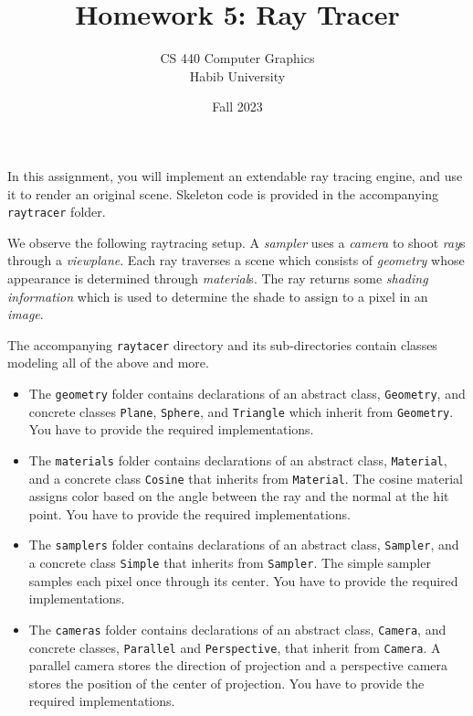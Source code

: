 \documentclass[addpoints]{exam}
\title{Homework 5: Ray Tracer}
\author{CS 440 Computer Graphics\\Habib University}
\date{Fall 2023}
\begin{document}
\maketitle
\thispagestyle{empty}

In this assignment, you will implement an extendable ray tracing engine, and use it to render an original scene. Skeleton code is provided in the accompanying \texttt{raytracer} folder.

\begin{questions}

  We observe the  following raytracing setup. A \textit{sampler} uses a \textit{camera} to shoot \textit{ray}s through a \textit{viewplane}. Each ray traverses a scene which consists of \textit{geometry} whose appearance is determined through \emph{material}s. The ray returns some \textit{shading information} which is used to determine the shade to assign to a pixel in an \textit{image}.

The accompanying \texttt{raytacer} directory and its sub-directories contain classes modeling all of the above and more.
\begin{itemize}
\item The \texttt{geometry} folder contains declarations of an abstract class, \texttt{Geometry}, and concrete classes  \texttt{Plane}, \texttt{Sphere}, and \texttt{Triangle} which inherit from \texttt{Geometry}. You have to provide the required implementations.
\item The \texttt{materials} folder contains declarations of an abstract class, \texttt{Material}, and a concrete class  \texttt{Cosine} that inherits from \texttt{Material}. The cosine material assigns color based on the angle between the ray and the normal at the hit point. You have to provide the required implementations.
\item The \texttt{samplers} folder contains declarations of an abstract class, \texttt{Sampler}, and a concrete class  \texttt{Simple} that inherits from \texttt{Sampler}. The simple sampler samples each pixel once through its center. You have to provide the required implementations.
\item The \texttt{cameras} folder contains declarations of an abstract class, \texttt{Camera}, and concrete classes, \texttt{Parallel} and \texttt{Perspective}, that inherit from \texttt{Camera}. A parallel camera stores the direction of projection and a perspective camera stores the position of the center of projection. You have to provide the required implementations.
\end{itemize}


\end{questions}
\end{document}
